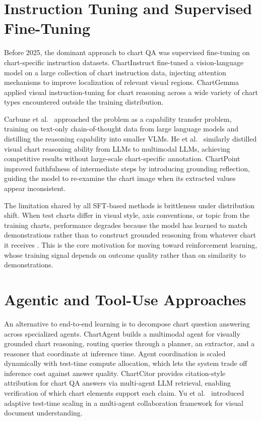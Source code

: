 \documentclass{iutbscthesis}
\begin{document}
\section{Instruction Tuning and Supervised Fine-Tuning}

Before 2025, the dominant approach to chart QA was supervised fine-tuning on chart-specific instruction datasets. ChartInstruct \cite{masry2024chartinstruct} fine-tuned a vision-language model on a large collection of chart instruction data, injecting attention mechanisms to improve localization of relevant visual regions. ChartGemma \cite{masry2025chartgemma} applied visual instruction-tuning for chart reasoning across a wide variety of chart types encountered outside the training distribution.

Carbune et al.\ \cite{carbune2024chartbased} approached the problem as a capability transfer problem, training on text-only chain-of-thought data from large language models and distilling the reasoning capability into smaller VLMs. He et al.\ \cite{he2025distill} similarly distilled visual chart reasoning ability from LLMs to multimodal LLMs, achieving competitive results without large-scale chart-specific annotation. ChartPoint \cite{xu2025chartpoint} improved faithfulness of intermediate steps by introducing grounding reflection, guiding the model to re-examine the chart image when its extracted values appear inconsistent.

The limitation shared by all SFT-based methods is brittleness under distribution shift. When test charts differ in visual style, axis conventions, or topic from the training charts, performance degrades because the model has learned to match demonstrations rather than to construct grounded reasoning from whatever chart it receives \cite{sinha2025chartrvr}. This is the core motivation for moving toward reinforcement learning, whose training signal depends on outcome quality rather than on similarity to demonstrations.

\section{Agentic and Tool-Use Approaches}

An alternative to end-to-end learning is to decompose chart question answering across specialized agents. ChartAgent \cite{kaur2025chartagent} builds a multimodal agent for visually grounded chart reasoning, routing queries through a planner, an extractor, and a reasoner that coordinate at inference time. Agent coordination is scaled dynamically with test-time compute allocation, which lets the system trade off inference cost against answer quality. ChartCitor \cite{goswami2025chartcitor} provides citation-style attribution for chart QA answers via multi-agent LLM retrieval, enabling verification of which chart elements support each claim. Yu et al.\ \cite{yu2025visual} introduced adaptive test-time scaling in a multi-agent collaboration framework for visual document understanding.
\end{document}
